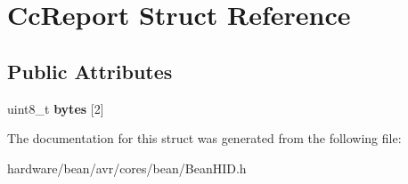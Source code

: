 \hypertarget{struct_cc_report}{}\section{Cc\+Report Struct Reference}
\label{struct_cc_report}
\subsection*{Public Attributes}
\begin{DoxyCompactItemize}
\item 
\hypertarget{struct_cc_report_accbeb8de031a175ebf43b5fcaaa02836}{}uint8\+\_\+t {\bfseries bytes} \mbox{[}2\mbox{]}\label{struct_cc_report_accbeb8de031a175ebf43b5fcaaa02836}

\end{DoxyCompactItemize}


The documentation for this struct was generated from the following file\+:\begin{DoxyCompactItemize}
\item 
hardware/bean/avr/cores/bean/Bean\+H\+I\+D.\+h\end{DoxyCompactItemize}
